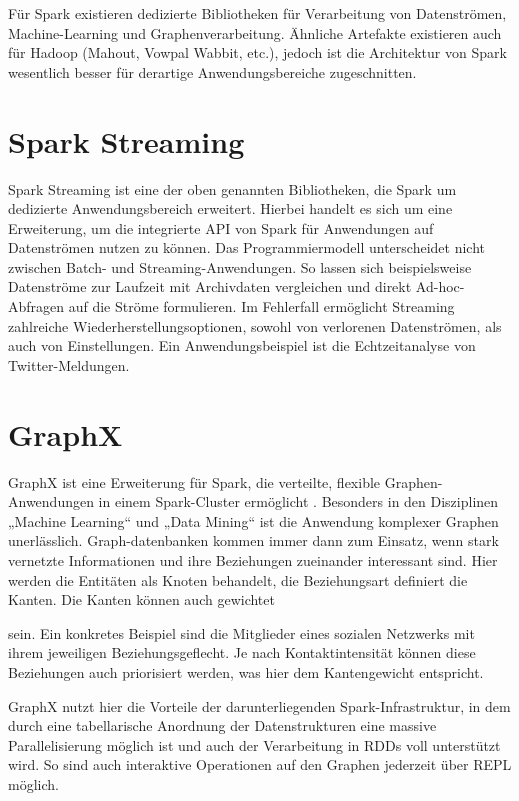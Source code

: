 Für Spark existieren dedizierte Bibliotheken für Verarbeitung von Datenströmen, Machine-Learning und Graphenverarbeitung. Ähnliche Artefakte existieren auch für Hadoop (Mahout, Vowpal Wabbit, etc.), jedoch ist die Architektur von Spark wesentlich besser für derartige Anwendungsbereiche zugeschnitten. 
   
\section{Spark Streaming}
\label{section:spark Streaming}


Spark Streaming ist eine der oben genannten Bibliotheken, die Spark um dedizierte Anwendungsbereich erweitert. Hierbei handelt es sich um eine Erweiterung, um die integrierte API von Spark für Anwendungen auf Datenströmen nutzen zu können. Das Programmiermodell unterscheidet nicht zwischen Batch- und Streaming-Anwendungen. So lassen sich beispielsweise Datenströme zur Laufzeit mit Archivdaten vergleichen und direkt Ad-hoc-Abfragen auf die Ströme formulieren. Im Fehlerfall ermöglicht Streaming zahlreiche Wiederherstellungsoptionen, sowohl von verlorenen Datenströmen, als auch von Einstellungen. Ein Anwendungsbeispiel ist die Echtzeitanalyse von Twitter-Meldungen. 

\section{GraphX}
\label{section:graphX}


GraphX ist eine Erweiterung für Spark, die verteilte, flexible Graphen-Anwendungen in einem Spark-Cluster ermöglicht . Besonders in den Disziplinen „Machine Learning“ und „Data Mining“ ist die Anwendung komplexer Graphen unerlässlich. Graph-datenbanken kommen immer dann zum Einsatz, wenn stark vernetzte Informationen und ihre Beziehungen zueinander interessant sind. Hier werden die Entitäten als Knoten behandelt, die Beziehungsart definiert die Kanten. Die Kanten können auch gewichtet 

sein. Ein konkretes Beispiel sind die Mitglieder eines sozialen Netzwerks mit ihrem jeweiligen Beziehungsgeflecht. Je nach Kontaktintensität können diese Beziehungen auch priorisiert werden, was hier dem Kantengewicht entspricht.

GraphX nutzt hier die Vorteile der darunterliegenden Spark-Infrastruktur, in dem durch eine tabellarische Anordnung der Datenstrukturen eine massive Parallelisierung möglich ist und auch der Verarbeitung in RDDs voll unterstützt wird. So sind auch interaktive Operationen auf den Graphen jederzeit über REPL möglich. 

